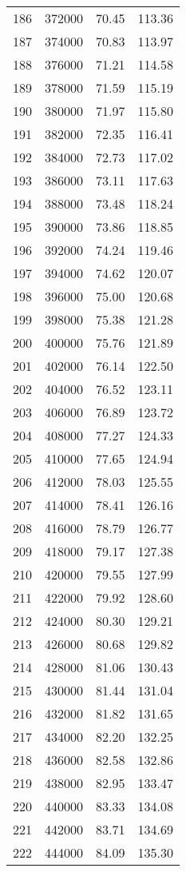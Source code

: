 \documentclass{article}
\begin{document}
\begin{longtable}{@{}l l l l}
186 & 372000 & 70.45 & 113.36\\
187 & 374000 & 70.83 & 113.97\\
188 & 376000 & 71.21 & 114.58\\
189 & 378000 & 71.59 & 115.19\\
190 & 380000 & 71.97 & 115.80\\
191 & 382000 & 72.35 & 116.41\\
192 & 384000 & 72.73 & 117.02\\
193 & 386000 & 73.11 & 117.63\\
194 & 388000 & 73.48 & 118.24\\
195 & 390000 & 73.86 & 118.85\\
196 & 392000 & 74.24 & 119.46\\
197 & 394000 & 74.62 & 120.07\\
198 & 396000 & 75.00 & 120.68\\
199 & 398000 & 75.38 & 121.28\\
200 & 400000 & 75.76 & 121.89\\
201 & 402000 & 76.14 & 122.50\\
202 & 404000 & 76.52 & 123.11\\
203 & 406000 & 76.89 & 123.72\\
204 & 408000 & 77.27 & 124.33\\
205 & 410000 & 77.65 & 124.94\\
206 & 412000 & 78.03 & 125.55\\
207 & 414000 & 78.41 & 126.16\\
208 & 416000 & 78.79 & 126.77\\
209 & 418000 & 79.17 & 127.38\\
210 & 420000 & 79.55 & 127.99\\
211 & 422000 & 79.92 & 128.60\\
212 & 424000 & 80.30 & 129.21\\
213 & 426000 & 80.68 & 129.82\\
214 & 428000 & 81.06 & 130.43\\
215 & 430000 & 81.44 & 131.04\\
216 & 432000 & 81.82 & 131.65\\
217 & 434000 & 82.20 & 132.25\\
218 & 436000 & 82.58 & 132.86\\
219 & 438000 & 82.95 & 133.47\\
220 & 440000 & 83.33 & 134.08\\
221 & 442000 & 83.71 & 134.69\\
222 & 444000 & 84.09 & 135.30\\

\end{longtable}
\end{document}
